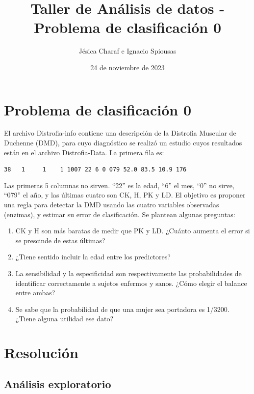 \documentclass[
]{article}
\title{Taller de Análisis de datos - Problema de clasificación 0}
\author{Jésica Charaf e Ignacio Spiousas}
\date{24 de noviembre de 2023}
\begin{document}
\maketitle

\hypertarget{problema-de-clasificaciuxf3n-0}{%
\section{Problema de clasificación
0}\label{problema-de-clasificaciuxf3n-0}}

El archivo Distrofia-info contiene una descripción de la Distrofia
Muscular de Duchenne (DMD), para cuyo diagnóstico se realizó un estudio
cuyos resultados están en el archivo Distrofia-Data. La primera fila es:

\texttt{38\ \ \ 1\ \ \ \ \ 1\ \ \ \ 1\ 1007\ 22\ 6\ 0\ 079\ 52.0\ 83.5\ 10.9\ 176}

Las primeras 5 columnas no sirven. ``22'' es la edad, ``6'' el mes,
``0'' no sirve, ``079'' el año, y las últimas cuatro son CK, H, PK y LD.
El objetivo es proponer una regla para detectar la DMD usando las cuatro
variables observadas (enzimas), y estimar su error de clasificación. Se
plantean algunas preguntas:

\begin{enumerate}
\def\labelenumi{\alph{enumi})}
\item
  CK y H son más baratas de medir que PK y LD. ¿Cuánto aumenta el error
  si se prescinde de estas últimas?
\item
  ¿Tiene sentido incluir la edad entre los predictores?
\item
  La sensibilidad y la especificidad son respectivamente las
  probabilidades de identificar correctamente a sujetos enfermos y
  sanos. ¿Cómo elegir el balance entre ambas?
\item
  Se sabe que la probabilidad de que una mujer sea portadora es 1/3200.
  ¿Tiene alguna utilidad ese dato?
\end{enumerate}

\hypertarget{resoluciuxf3n}{%
\section{Resolución}\label{resoluciuxf3n}}

\hypertarget{anuxe1lisis-exploratorio}{%
\subsection{Análisis exploratorio}\label{anuxe1lisis-exploratorio}}
\end{document}
